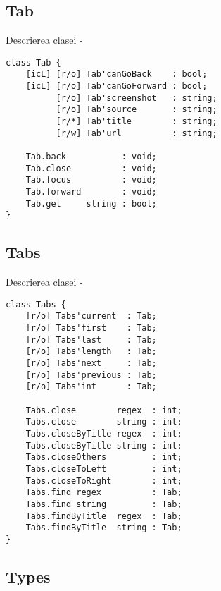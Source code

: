 \subsection{{\color{orange} Tab}}

\noindent Descrierea clasei  -
\begin{lstlisting}[numbers=none]
class Tab {
	[icL] [r/o] Tab'canGoBack    : bool;
	[icL] [r/o] Tab'canGoForward : bool;
	      [r/o] Tab'screenshot   : string;
	      [r/o] Tab'source       : string;
	      [r/*] Tab'title        : string;
	      [r/w] Tab'url          : string;

	Tab.back           : void;
	Tab.close          : void;
	Tab.focus          : void;
	Tab.forward        : void;
	Tab.get     string : bool;
}
\end{lstlisting}

\subsection{{\color{orange} Tabs}}

\noindent Descrierea clasei  -
\begin{lstlisting}[numbers=none]
class Tabs {
	[r/o] Tabs'current  : Tab;
	[r/o] Tabs'first    : Tab;
	[r/o] Tabs'last     : Tab;
	[r/o] Tabs'length   : Tab;
	[r/o] Tabs'next     : Tab;
	[r/o] Tabs'previous : Tab;
	[r/o] Tabs'int      : Tab;
	
	Tabs.close        regex  : int;
	Tabs.close        string : int;
	Tabs.closeByTitle regex  : int;
	Tabs.closeByTitle string : int;
	Tabs.closeOthers         : int;
	Tabs.closeToLeft         : int;
	Tabs.closeToRight        : int;
	Tabs.find regex          : Tab;
	Tabs.find string         : Tab;
	Tabs.findByTitle  regex  : Tab;
	Tabs.findByTitle  string : Tab;
}
\end{lstlisting}

\subsection{{\color{orange} Types}}

